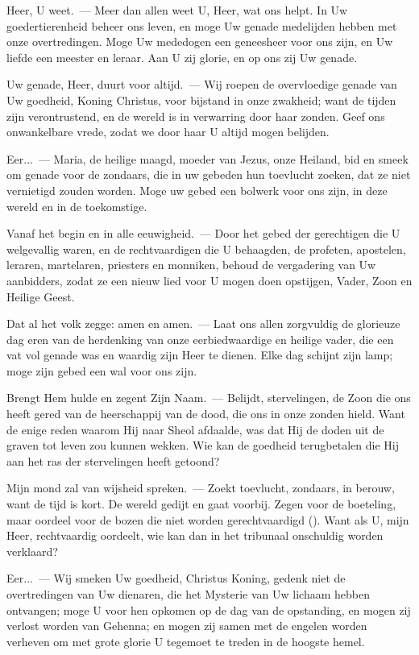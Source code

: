 \documentclass[12pt,twoside,a5paper]{article}
\begin{document}
\begin{halfparskip}
   Heer, U weet.~--- Meer dan allen weet U, Heer, wat ons helpt. In Uw goedertierenheid beheer ons leven, en moge Uw genade medelijden hebben met onze overtredingen. Moge Uw mededogen een geneesheer voor ons zijn, en Uw liefde een meester en leraar. Aan U zij glorie, en op ons zij Uw genade.

  Uw genade, Heer, duurt voor altijd.~--- Wij roepen de overvloedige genade van Uw goedheid, Koning Christus, voor bijstand in onze zwakheid; want de tijden zijn verontrustend, en de wereld is in verwarring door haar zonden. Geef ons onwankelbare vrede, zodat we door haar U altijd mogen belijden.

  Eer...~--- Maria, de heilige maagd, moeder van Jezus, onze Heiland, bid en smeek om genade voor de zondaars, die in uw gebeden hun toevlucht zoeken, dat ze niet vernietigd zouden worden. Moge uw gebed een bolwerk voor ons zijn, in deze wereld en in de toekomstige.

  Vanaf het begin en in alle eeuwigheid.~--- Door het gebed der gerechtigen die U welgevallig waren, en de rechtvaardigen die U behaagden, de profeten, apostelen, leraren, martelaren, priesters en monniken, behoud de vergadering van Uw aanbidders, zodat ze een nieuw lied voor U mogen doen opstijgen, Vader, Zoon en Heilige Geest.

  Dat al het volk zegge: amen en amen.~--- Laat ons allen zorgvuldig de glorieuze dag eren van de herdenking van onze eerbiedwaardige en heilige vader, die een vat vol genade was en waardig zijn Heer te dienen. Elke dag schijnt zijn lamp; moge zijn gebed een wal voor ons zijn.
\end{halfparskip}


\begin{halfparskip}
  Brengt Hem hulde en zegent Zijn Naam.~--- Belijdt, stervelingen, de Zoon die ons heeft gered van de heerschappij van de dood, die ons in onze zonden hield. Want de enige reden waarom Hij naar Sheol afdaalde, was dat Hij de doden uit de graven tot leven zou kunnen wekken. Wie kan de goedheid terugbetalen die Hij aan het ras der stervelingen heeft getoond?

  Mijn mond zal van wijsheid spreken.~--- Zoekt toevlucht, zondaars, in berouw, want de tijd is kort. De wereld gedijt en gaat voorbij. Zegen voor de boeteling, maar oordeel voor de bozen die niet worden gerechtvaardigd (). Want als U, mijn Heer, rechtvaardig oordeelt, wie kan dan in het tribunaal onschuldig worden verklaard?

  Eer...~--- Wij smeken Uw goedheid, Christus Koning, gedenk niet de overtredingen van Uw dienaren, die het Mysterie van Uw lichaam hebben ontvangen; moge U voor hen opkomen op de dag van de opstanding, en mogen zij verlost worden van Gehenna; en mogen zij samen met de engelen worden verheven om met grote glorie U tegemoet te treden in de hoogste hemel.
\end{halfparskip}
\end{document}
